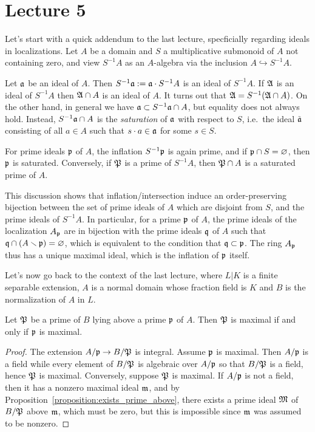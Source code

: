 \section{Lecture 5}

Let's start with a quick addendum to the last lecture, specficially regarding ideals in localizations.
Let $A$ be a domain and $S$ a multiplicative submonoid of $A$ not containing zero, and view $S^{-1}A$ as an $A$-algebra via the inclusion $A \hookrightarrow S^{-1}A$.

Let $\mathfrak{a}$ be an ideal of $A$.
Then $S^{-1}\mathfrak{a} := \mathfrak{a} \cdot S^{-1}A$ is an ideal of $S^{-1}A$.
If $\mathfrak{A}$ is an ideal of $S^{-1}A$ then $\mathfrak{A} \cap A$ is an ideal of $A$.
It turns out that $\mathfrak{A} = S^{-1}(\mathfrak{A} \cap A)$.
On the other hand, in general we have $\mathfrak{a} \subset S^{-1}\mathfrak{a} \cap A$, but equality does not always hold.
Instead, $S^{-1}\mathfrak{a} \cap A$ is the \emph{saturation} of $\mathfrak{a}$ with respect to $S$, i.e.~the ideal $\tilde {\mathfrak{a}}$ consisting of all $a \in A$ such that $s \cdot a \in \mathfrak{a}$ for some $s \in S$.

For prime ideals $\mathfrak{p}$ of $A$, the inflation $S^{-1}\mathfrak{p}$ is again prime, and if $\mathfrak{p} \cap S = \varnothing$, then $\mathfrak{p}$ is saturated.
Conversely, if $\mathfrak{P}$ is a prime of $S^{-1}A$, then $\mathfrak{P} \cap A$ is a saturated prime of $A$.

This discussion shows that inflation/intersection induce an order-preserving bijection between the set of prime ideals of $A$ which are disjoint from $S$, and the prime ideals of $S^{-1}A$.
In particular, for a prime $\mathfrak{p}$ of $A$, the prime ideals of the localization $A_{\mathfrak{p}}$ are in bijection with the prime ideals $\mathfrak{q}$ of $A$ such that $\mathfrak{q} \cap (A \smallsetminus \mathfrak{p}) = \varnothing$, which is equivalent to the condition that $\mathfrak{q} \subset \mathfrak{p}$.
The ring $A_{\mathfrak{p}}$ thus has a unique maximal ideal, which is the inflation of $\mathfrak{p}$ itself.

Let's now go back to the context of the last lecture, where $L|K$ is a finite separable extension, $A$ is a normal domain whose fraction field is $K$ and $B$ is the normalization of $A$ in $L$.
\begin{proposition}
  Let $\mathfrak{P}$ be a prime of $B$ lying above a prime $\mathfrak{p}$ of $A$.
  Then $\mathfrak{P}$ is maximal if and only if $\mathfrak{p}$ is maximal.
\end{proposition}
\begin{proof}
  The extension $A/\mathfrak{p} \to B/\mathfrak{P}$ is integral.
  Assume $\mathfrak{p}$ is maximal.
  Then $A/\mathfrak{p}$ is a field while every element of $B/\mathfrak{P}$ is algebraic over $A/\mathfrak{p}$ so that $B/\mathfrak{P}$ is a field, hence $\mathfrak{P}$ is maximal.
  Conversely, suppose $\mathfrak{P}$ is maximal.
  If $A/\mathfrak{p}$ is not a field, then it has a nonzero maximal ideal $\mathfrak{m}$, and by Proposition~\ref{proposition:exists_prime_above},  there exists a prime ideal $\mathfrak{M}$ of $B/\mathfrak{P}$ above $\mathfrak{m}$, which must be zero, but this is impossible since $\mathfrak{m}$ was assumed to be nonzero.
\end{proof}

